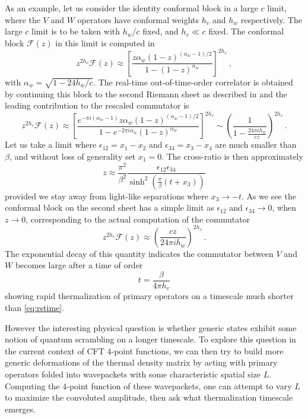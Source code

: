 \documentclass{brownthesis}
\begin{document}
As an example, let us consider the identity conformal block in a large
$c$ limit, where the $V$ and $W$ operators have conformal weights
$h_{v}$ and $h_{w}$ respectively. The large $c$ limit is to be
taken with $h_{w}/c$ fixed, and $h_{v}\ll c$ fixed. The conformal
block $\mathcal{F}(z)$ in this limit is computed in \cite{Fitzpatrick:2014vua,Fitzpatrick:2015zha}
\begin{equation}
z^{2h_{v}}\mathcal{F}(z)\approx\left[\frac{z\alpha_{w}(1-z)^{(\alpha_{w}-1)/2}}{1-(1-z)^{\alpha_{w}}}\right]^{2h_{v}}\,,\label{eq:prinblock}
\end{equation}
with $\alpha_{w}=\sqrt{1-24h_{w}/c}$. The real-time out-of-time-order
correlator is obtained by continuing this block to the second Riemann
sheet as described in \cite{PhysRevLett.115.131603} and the leading
contribution to the rescaled commutator is
\begin{equation}
z^{2h_{v}}\mathcal{F}(z)\approx\left[\frac{e^{-\pi i(\alpha_{w}-1)}z\alpha_{w}(1-z)^{(\alpha_{w}-1)/2}}{1-e^{-2\pi i\alpha_{w}}(1-z)^{\alpha_{w}}}\right]^{2h_{v}}\sim\left(\frac{1}{1-\frac{24\pi ih_{w}}{cz}}\right)^{2h_{v}}\,.\label{eq:identityblock}
\end{equation}
Let us take a limit where $\epsilon_{12}=x_{1}-x_{2}$ and $\epsilon_{34}=x_{3}-x_{4}$
are much smaller than $\beta$, and without loss of generality set
$x_{1}=0$. The cross-ratio is then approximately
\[
z\approx\frac{\pi^{2}}{\beta^{2}}\frac{\epsilon_{12}\epsilon_{34}}{\sinh^{2}\left(\frac{\pi}{\beta}\left(t+x_{3}\right)\right)}
\]
provided we stay away from light-like separations where $x_{3}\to-t$.
As we see the conformal block on the second sheet has a simple limit
as $\epsilon_{12}$ and $\epsilon_{34}\to0$, when $z\to0$, corresponding
to the actual computation of the commutator
\begin{equation}
z^{2h_{v}}\mathcal{F}(z)\approx\left(\frac{cz}{24\pi ih_{w}}\right)^{2h_{v}}\,.\label{eq:latetimeblock}
\end{equation}
The exponential decay of this quantity indicates the commutator between
$V$ and $W$ becomes large after a time of order
\begin{equation}
t=\frac{\beta}{4\pi h_{v}}\label{eq:primarytime}
\end{equation}
showing rapid thermalization of primary operators on a timescale much
shorter than \eqref{eq:rstime}.

However the interesting physical question is whether generic states
exhibit some notion of quantum scrambling on a longer timescale. To
explore this question in the current context of CFT 4-point functions,
we can then try to build more generic deformations of the thermal
density matrix by acting with primary operators folded into wavepackets
with some characteristic spatial size $L$. Computing the 4-point
function of these wavepackets, one can attempt to vary $L$ to maximize
the convoluted amplitude, then ask what thermalization timescale emerges.
\end{document}
